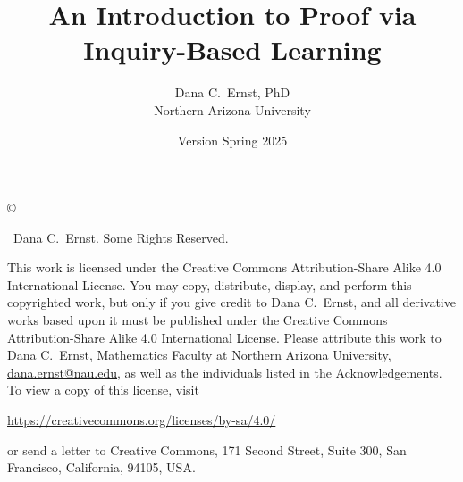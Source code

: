 \documentclass[12pt,oneside]{book}
\theoremstyle{definition}
\begin{document}
\title{An Introduction to Proof via \\Inquiry-Based Learning}
\author{Dana C.~Ernst, PhD\\
Northern Arizona University}
\date{Version Spring 2025}

\maketitle
\thispagestyle{empty}

\noindent\copyright{ \the\year\ Dana C.~Ernst.  Some Rights Reserved.\\

\bigskip

\noindent This work is licensed under the Creative Commons Attribution-Share Alike 4.0 International License.  You may copy, distribute, display, and perform this copyrighted work, but only if you give credit to Dana C.~Ernst, and all derivative works based upon it must be published under the Creative Commons Attribution-Share Alike 4.0 International License. Please attribute this work to Dana C.~Ernst, Mathematics Faculty at Northern Arizona University, \url{dana.ernst@nau.edu}, as well as the individuals listed in the Acknowledgements. To view a copy of this license, visit
\begin{center}
\url{https://creativecommons.org/licenses/by-sa/4.0/}
\end{center}
or send a letter to Creative Commons, 171 Second Street, Suite 300, San Francisco, California, 94105, USA.}

\medskip

\begin{center}
\ccbysa
\end{center}

\bigskip

\tableofcontents

































%


 













\end{document}
